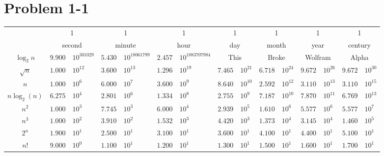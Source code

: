 \documentclass{article}
\begin{document}
\section*{Problem 1-1}

\begin{tabular}{c|r@{$\cdot$}l|r@{$\cdot$}l|r@{$\cdot$}l|r@{$\cdot$}l|r@{$\cdot$}l|r@{$\cdot$}l|r@{$\cdot$}l|}
	& \multicolumn{2}{c|}{1} & \multicolumn{2}{c|}{1} & \multicolumn{2}{c|}{1} & \multicolumn{2}{c|}{1} & \multicolumn{2}{c|}{1} & \multicolumn{2}{c|}{1} & \multicolumn{2}{c|}{1} \\
	& \multicolumn{2}{c|}{second} & \multicolumn{2}{c|}{minute} & \multicolumn{2}{c|}{hour} & \multicolumn{2}{c|}{day} & \multicolumn{2}{c|}{month} & \multicolumn{2}{c|}{year} & \multicolumn{2}{c|}{century} \\ \hline
	$\log_2 n$    & $9.900$ & $10^{301029}$ & $5.430$ & $10^{18061799}$ & $2.457$ & $10^{1083707984}$ & \multicolumn{2}{c|}{This} & \multicolumn{2}{c|}{Broke} & \multicolumn{2}{c|}{Wolfram} & \multicolumn{2}{c|}{Alpha} \\ \hline
	$\sqrt{n}$    & $1.000$ & $10^{12}$     & $3.600$ & $10^{13}$       & $1.296$ & $10^{19}$         & $7.465$ & $10^{21}$       & $6.718$ & $10^{24}$        & $9.672$ & $10^{26}$          & $9.672$ & $10^{30}$ \\ \hline
	$n$           & $1.000$ & $10^6$        & $6.000$ & $10^{7}$        & $3.600$ & $10^{9}$          & $8.640$ & $10^{10}$       & $2.592$ & $10^{12}$        & $3.110$ & $10^{13}$          & $3.110$ & $10^{15}$ \\ \hline
	$n \log_2(n)$ & $6.275$ & $10^{4}$      & $2.801$ & $10^{6}$        & $1.334$ & $10^{8}$          & $2.755$ & $10^{9}$        & $7.187$ & $10^{10}$        & $7.870$ & $10^{11}$          & $6.769$ & $10^{13}$ \\ \hline
	$n^2$         & $1.000$ & $10^3$        & $7.745$ & $10^3$          & $6.000$ & $10^4$            & $2.939$ & $10^5$          & $1.610$ & $10^6$           & $5.577$ & $10^6$             & $5.577$ & $10^7$ \\ \hline
	$n^3$         & $1.000$ & $10^2$        & $3.910$ & $10^2$          & $1.532$ & $10^3$            & $4.420$ & $10^3$          & $1.373$ & $10^4$           & $3.145$ & $10^4$             & $1.460$ & $10^5$ \\ \hline
	$2^n$         & $1.900$ & $10^1$        & $2.500$ & $10^1$          & $3.100$ & $10^1$            & $3.600$ & $10^1$          & $4.100$ & $10^1$           & $4.400$ & $10^1$             & $5.100$ & $10^1$ \\ \hline
	$n!$          & $9.000$ & $10^0$        & $1.100$ & $10^1$          & $1.200$ & $10^1$            & $1.300$ & $10^1$          & $1.500$ & $10^1$           & $1.600$ & $10^1$             & $1.700$ & $10^1$ \\ \hline
\end{tabular}
\end{document}
